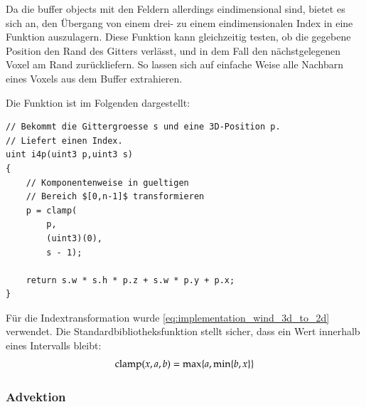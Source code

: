 Da die buffer objects mit den Feldern allerdings eindimensional sind,
bietet es sich an, den Übergang von einem drei- zu einem
eindimensionalen Index in eine Funktion auszulagern. Diese Funktion
kann gleichzeitig testen, ob die gegebene Position den Rand des
Gitters verlässt, und in dem Fall den nächstgelegenen Voxel am Rand
zurückliefern. So lassen sich auf einfache Weise alle Nachbarn eines
Voxels aus dem Buffer extrahieren.

Die Funktion  ist im Folgenden
dargestellt:

\begin{verbatim}
// Bekommt die Gittergroesse s und eine 3D-Position p.
// Liefert einen Index.
uint i4p(uint3 p,uint3 s)
{
    // Komponentenweise in gueltigen
    // Bereich $[0,n-1]$ transformieren
    p = clamp(
        p,
        (uint3)(0),
        s - 1);

    return s.w * s.h * p.z + s.w * p.y + p.x;
}
\end{verbatim}

Für die Indextransformation wurde
\cref{eq:implementation_wind_3d_to_2d} verwendet.  Die
Standardbibliotheksfunktion  stellt sicher,
dass ein Wert innerhalb eines Intervalls bleibt:
\begin{align}
\textnormal{clamp}(x,a,b) = \max \{ a,\min \{ b,x \} \}
\end{align}

\subsubsection{Advektion}
\label{sec:implementation_wind_advection}

